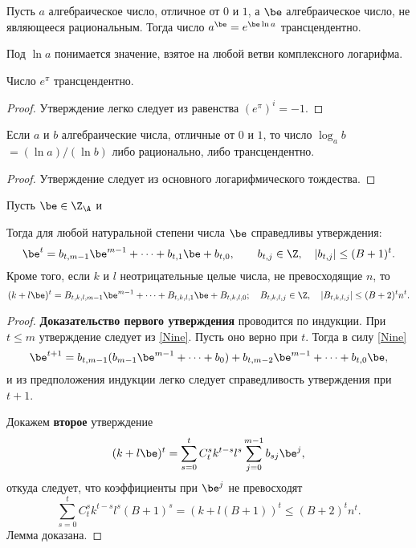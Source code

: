 \documentclass{article}
\begin{document}
\begin{theorem}
Пусть $a$ \т алгебраическое число,
отличное от $0$  и $1$, а $\be$  \т алгебраическое число,
не являющееся рациональным.  Тогда число $a^{\be}=e^{\be\ln a}$
трансцендентно.
\end{theorem}

\begin{note}
Под $\ln a$ понимается значение, взятое на любой ветви комплексного логарифма.
\end{note}

\begin{imp}Число $e^{\pi}$ трансцендентно.
\end{imp}
\begin{proof} Утверждение легко следует из равенства $(e^{\pi})^i=-1$. \end{proof}

\begin{imp}
Если $a$  и $b$ \т алгебраические числа,
отличные  от $0$  и $1$,  то число $\log_ab$ $=(\ln a)/(\ln b)$
либо рационально, либо трансцендентно.
\end{imp}
\begin{proof}
Утверждение следует из основного логарифмического тождества.
\end{proof}

\begin{lemma}\label{LemmaFour}
Пусть $\be\in\Z_{\A}$ и


Тогда для любой натуральной степени   числа  $\be$ справедливы утверждения:
$$
\be^t=b_{t,m-1}\be^{m-1}+\dots + b_{t,1}\be +b_{t,0}, \qquad
b_{t,j}\in\Z, \quad |b_{t,j}| \le (B+1)^t.
$$
Кроме того, если $k$  и $l$  \т неотрицательные целые
числа, не превосходящие $n$,  то
$$
(k+l\be)^t=B_{t,k,l,m-1}\be^{m-1}+\dots +B_{t,k,l,1}\be +B_{t,k,l,0};
\quad B_{t,k,l,j}\in \Z, \quad |B_{t,k,l,j}|\le (B+2)^tn^t.
$$
\end{lemma}

\begin{proof}
\textbf{Доказательство первого утверждения}
проводится по индукции. При $t\le m$ утверждение следует
из \eqref{Nine}. Пусть оно верно при $t$. Тогда в силу \eqref{Nine}
$$
\be^{t+1}=b_{t,m-1}(b_{m-1}\be^{m-1}+ \dots +b_0)+
b_{t,m-2}\be^{m-1}+ \dots +b_{t,0}\be,
$$
и из предположения индукции легко следует справедливость утверждения  при $t+1$.

Докажем \textbf{второе} утверждение
$$
(k+l\be)^t=\sum_{s=0}^tC_t^sk^{t-s}l^s\sum_{j=0}^{m-1}b_{sj}\be^j,
$$
откуда следует, что коэффициенты при $\be^j$ не превосходят
$$
\sum_{s=0}^tC_t^sk^{t-s}l^s(B+1)^s=(k+l(B+1))^t \le (B+2)^tn^t.
$$
Лемма доказана.
\end{proof}
\end{document}
